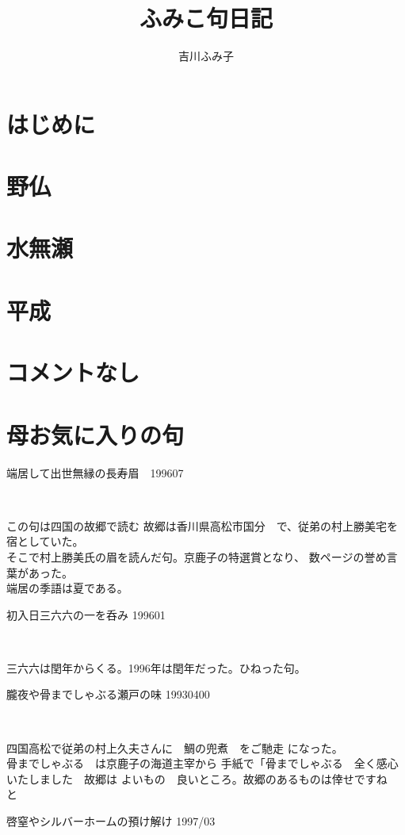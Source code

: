 \documentclass[b5paper]{tbook}
\begin{document}
\author{吉川ふみ子}
\title{ふみこ句日記}
\maketitle
\tableofcontents
\chapter*{はじめに}

\chapter{野仏}

\chapter{水無瀬}

\chapter{平成}

\vspace{0.6cm}
\chapter{コメントなし}

\chapter{母お気に入りの句}%
\begin{shiika}端居して出世無縁の長寿眉　\hfill{199607}　\end{shiika}　　　

この句は四国の故郷で読む
故郷は香川県高松市国分　で、従弟の村上勝美宅を宿としていた。
\\そこで村上勝美氏の眉を読んだ句。京鹿子の特選賞となり、
数ページの誉め言葉があった。\\端居の季語は夏である。

\vspace{5mm}
\begin{shiika}初入日三六六の一を呑み 199601　\end{shiika}　

三六六は閏年からくる。1996年は閏年だった。ひねった句。
\vspace{5mm}
\begin{shiika}朧夜や骨までしゃぶる瀬戸の味 19930400\end{shiika}　

四国高松で従弟の村上久夫さんに　鯛の兜煮　をご馳走
になった。
\\骨までしゃぶる　は京鹿子の海道主宰から
手紙で「骨までしゃぶる　全く感心いたしました　故郷は
よいもの　良いところ。故郷のあるものは倖せですね　と
\vspace{5mm}
\begin{shiika}啓窒やシルバーホームの預け解け 1997/03\end{shiika}
\end{document}
